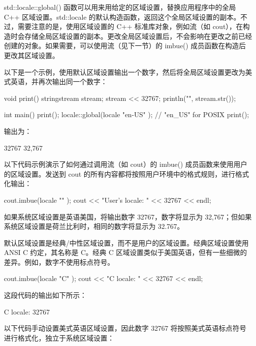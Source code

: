 
std::locale::global() 函数可以用来用给定的区域设置，替换应用程序中的全局 C++ 区域设置。std::locale 的默认构造函数，返回这个全局区域设置的副本。不过，需要注意的是，使用区域设置的 C++ 标准库对象，例如流（如 cout），在构造时会存储全局区域设置的副本。更改全局区域设置后，不会影响在更改之前已经创建的对象。如果需要，可以使用流（见下一节）的 imbue() 成员函数在构造后更改其区域设置。

以下是一个示例，使用默认区域设置输出一个数字，然后将全局区域设置更改为美式英语，并再次输出同一个数字：

\begin{cpp}
void print()
{
    stringstream stream;
    stream << 32767;
    println("{}", stream.str());
}

int main()
{
    print();
    locale::global(locale { "en-US" }); // "en_US" for POSIX
    print();
}
\end{cpp}

输出为：

\begin{shell}
32767
32,767
\end{shell}


以下代码示例演示了如何通过调用流（如 cout）的 imbue() 成员函数来使用用户的区域设置。发送到 cout 的所有内容都将按照用户环境中的格式规则，进行格式化输出：

\begin{cpp}
cout.imbue(locale { "" });
cout << "User's locale: " << 32767 << endl;
\end{cpp}

如果系统区域设置是英语美国，将输出数字 32767，数字将显示为 32,767；但如果系统区域设置是荷兰比利时，相同的数字将显示为 32.767。

默认区域设置是经典/中性区域设置，而不是用户的区域设置。经典区域设置使用 ANSI C 约定，其名称是 C。经典 C 区域设置类似于美国英语，但有一些细微的差异。例如，数字不使用标点符号。

\begin{cpp}
cout.imbue(locale { "C" });
cout << "C locale: " << 32767 << endl;
\end{cpp}

这段代码的输出如下所示：

\begin{shell}
C locale: 32767
\end{shell}

以下代码手动设置美式英语区域设置，因此数字 32767 将按照美式英语标点符号进行格式化，独立于系统区域设置：

